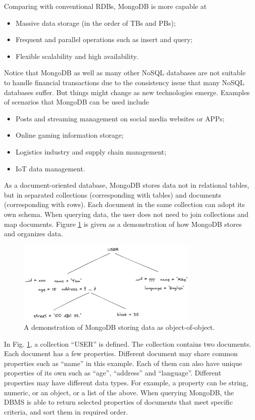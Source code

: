 Comparing with conventional RDBs, MongoDB is more capable at
\begin{itemize}
	\item Massive data storage (in the order of TBs and PBs);
	\item Frequent and parallel operations such as insert and query;
	\item Flexible scalability and high availability.
\end{itemize}
Notice that MongoDB as well as many other NoSQL databases are not suitable to handle financial transactions due to the consistency issue that many NoSQL databases suffer. But things might change as new technologies emerge.
Examples of scenarios that MongoDB can be used include
\begin{itemize}
	\item Posts and streaming management on social media websites or APPs;
	\item Online gaming information storage;
	\item Logistics industry and supply chain management;
	\item IoT data management.
\end{itemize}

As a document-oriented database, MongoDB stores data not in relational tables, but in separated collections (corresponding with tables) and documents (corresponding with rows). Each document in the same collection can adopt its own schema. When querying data, the user does not need to join collections and map documents. Figure \ref{ch:database:mongotree} is given as a demonstration of how MongoDB stores and organizes data.
\begin{figure}[htbp]
	\centering
	\includegraphics[width=250pt]{chapters/ch-database/figures/mongodb_tree.png}
	\caption{A demonstration of MongoDB storing data as object-of-object.} \label{ch:database:mongotree}
\end{figure}

In Fig. \ref{ch:database:mongotree}, a collection ``USER'' is defined. The collection contains two documents. Each document has a few properties. Different document may share common properties such as ``name'' in this example. Each of them can also have unique properties of its own such as ``age'', ``address'' and ``language''. Different properties may have different data types. For example, a property can be string, numeric, or an object, or a list of the above. When querying MongoDB, the DBMS is able to return selected properties of documents that meet specific criteria, and sort them in required order.

